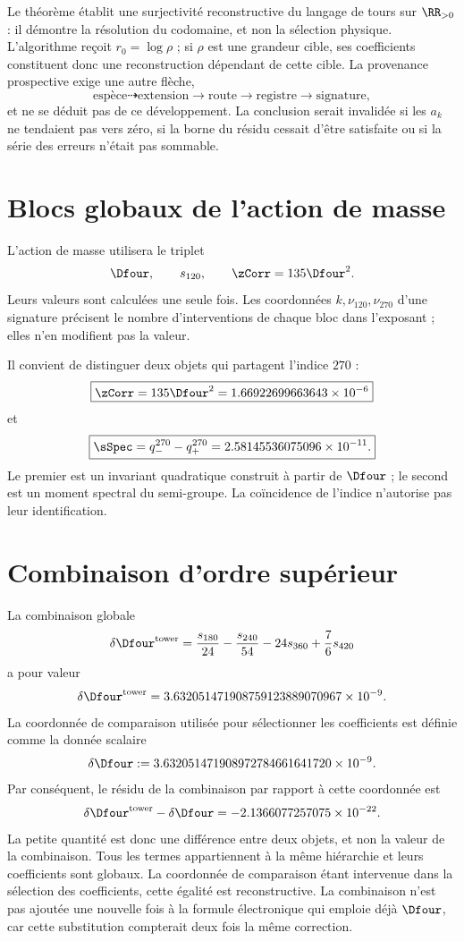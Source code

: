 \begin{remark}
Le théorème établit une surjectivité reconstructive du langage de tours sur \(\RR_{>0}\) : il démontre la résolution du codomaine, et non la sélection physique. L'algorithme reçoit \(r_0=\log\rho\) ; si \(\rho\) est une grandeur cible, ses coefficients constituent donc une reconstruction dépendant de cette cible. La provenance prospective exige une autre flèche,
\[
 \text{espèce}\dashrightarrow\text{extension}
 \longrightarrow\text{route}\longrightarrow\text{registre}
 \longrightarrow\text{signature},
\]
et ne se déduit pas de ce développement. La conclusion serait invalidée si les \(a_k\) ne tendaient pas vers zéro, si la borne du résidu cessait d'être satisfaite ou si la série des erreurs n'était pas sommable.
\end{remark}

\section{Blocs globaux de l'action de masse}

L'action de masse utilisera le triplet
\[
 \Dfour,\qquad s_{120},\qquad \zCorr=135\Dfour^2.
\]
Leurs valeurs sont calculées une seule fois. Les coordonnées \(k,\nu_{120},\nu_{270}\) d'une signature précisent le nombre d'interventions de chaque bloc dans l'exposant ; elles n'en modifient pas la valeur.

Il convient de distinguer deux objets qui partagent l'indice \(270\) :
\[
 \boxed{\zCorr=135\Dfour^2
 =1.66922699663643\times10^{-6}}
\]
et
\[
 \boxed{\sSpec=q_-^{270}-q_+^{270}
 =2.58145536075096\times10^{-11}.}
\]
Le premier est un invariant quadratique construit à partir de \(\Dfour\) ; le second est un moment spectral du semi-groupe. La coïncidence de l'indice n'autorise pas leur identification.

\section{Combinaison d'ordre supérieur}

La combinaison globale
\[
 \delta\Dfour^{\rm tower}
 =\frac{s_{180}}{24}-\frac{s_{240}}{54}
 -24s_{360}+\frac76s_{420}
\]
a pour valeur
\[
 \delta\Dfour^{\rm tower}
 =3.632051471908759123889070967\times10^{-9}.
\]
La coordonnée de comparaison utilisée pour sélectionner les coefficients est définie comme la donnée scalaire
\[
 \delta\Dfour
 :=3.632051471908972784661641720\times10^{-9}.
\]
Par conséquent, le résidu de la combinaison par rapport à cette coordonnée est
\[
 \delta\Dfour^{\rm tower}-\delta\Dfour
 =-2.1366077257075\times10^{-22}.
\]
La petite quantité est donc une différence entre deux objets, et non la valeur de la combinaison. Tous les termes appartiennent à la même hiérarchie et leurs coefficients sont globaux. La coordonnée de comparaison étant intervenue dans la sélection des coefficients, cette égalité est reconstructive. La combinaison n'est pas ajoutée une nouvelle fois à la formule électronique qui emploie déjà \(\Dfour\), car cette substitution compterait deux fois la même correction.
